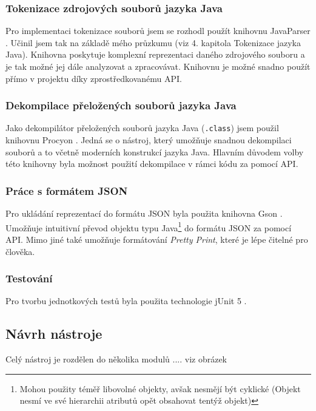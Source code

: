 			\subsubsection{Tokenizace zdrojových souborů jazyka Java}
				Pro implementaci tokenizace souborů jsem se rozhodl použít knihovnu JavaParser \cite{javaparser}. Učinil jsem tak na základě mého průzkumu (viz 4. kapitola Tokenizace jazyka Java). Knihovna poskytuje komplexní reprezentaci daného zdrojového souboru a je tak možné jej dále analyzovat a zpracovávat. Knihovnu je možné snadno použít přímo v projektu díky zprostředkovanému API.
			
			\subsubsection{Dekompilace přeložených souborů jazyka Java}
				Jako dekompilátor přeložených souborů jazyka Java (\texttt{.class}) jsem použil knihovnu Procyon \cite{procyon}. Jedná se o nástroj, který umožňuje snadnou dekompilaci souborů a to včetně moderních konstrukcí jazyka Java. Hlavním důvodem volby této knihovny byla možnost použití dekompilace v rámci kódu za pomocí API.
				
			\subsubsection{Práce s formátem JSON}
				Pro ukládání reprezentací do formátu JSON byla použita knihovna Gson \cite{gson}. Umožňuje intuitivní převod objektu typu Java\footnote{Mohou použity téměř libovolné objekty, avšak nesmějí být cyklické (Objekt nesmí ve své hierarchii atributů opět obsahovat tentýž objekt)} do formátu JSON za pomocí API. Mimo jiné také umožňuje formátování \emph{Pretty Print}, které je lépe čitelné pro člověka.
				
			\subsubsection{Testování}
				Pro tvorbu jednotkových testů byla použita technologie jUnit 5 \cite{junit}.   	 



		\subsection{Návrh nástroje}
			Celý nástroj je rozdělen do několika modulů .... viz obrázek
		


